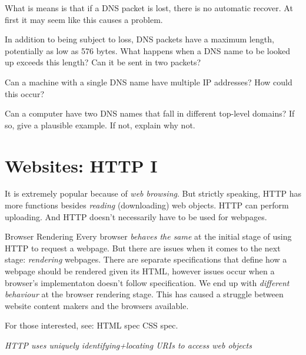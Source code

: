 What is means is that if a DNS packet is lost, there is no automatic recover. 
At first it may seem like this causes a problem. 


\frmrule

In addition to being subject to loss, DNS packets have a maximum length,
potentially as low as 576 bytes. What happens when a DNS name to be looked
up exceeds this length? Can it be sent in two packets?

\frmrule

Can a machine with a single DNS name have multiple IP addresses? How
could this occur?

\frmrule

Can a computer have two DNS names that fall in different top-level domains?
If so, give a plausible example. If not, explain why not.


\section{Websites: HTTP I}


It is extremely popular because of \textit{web browsing}. 
But strictly speaking, HTTP has more 
functions besides \textit{reading} (downloading) web objects. 
HTTP can perform uploading. And HTTP doesn't necessarily have 
to be used for webpages. 

\frmrule 


\frmrule 

\begin{sidenote}{Browser Rendering}
Every browser \textit{behaves the same} at the initial stage of 
using HTTP to request a webpage.
But there are issues when it comes to the next stage: \textit{rendering} webpages.  
There are separate specifications that define how a webpage should 
be rendered given its HTML, however issues occur when a browser's 
implementaton doesn't follow specification.
We end up with \textit{different behaviour} at the browser rendering stage.
This has caused a struggle between website content makers and the browsers available. 

For those interested, see: HTML spec CSS spec. 
\end{sidenote}

\frmrule 

\textit{HTTP uses uniquely identifying+locating URIs to \textit{access web objects}}


